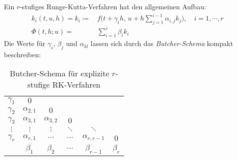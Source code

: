 \documentclass[a4paper, 11pt, accentcolor = tud3b]{tudreport}
\begin{document}
	            Ein \(r\)-stufiges Runge-Kutta-Verfahren hat den allgemeinen Aufbau:
	            \begin{align*}
	            	k_i(t, u, h) = k_i \coloneqq & \, f\Big( t + \gamma_i h,\, u + h \sum_{j=1}^{i-1} \alpha_{i,j} k_j \Big), \quad i = 1, \cdots, r \\
	            	\Phi(t, h; u) =              & \, \sum_{i=1}^{r} \beta_i k_i
	            \end{align*}
	            Die Werte für \( \gamma_i \), \( \beta_j \) und \( \alpha_{kl} \) lassen sich durch das \textit{Butcher-Schema} kompakt beschreiben:
	            \begin{table}[H]
	            	\centering
	            	\begin{tabular}{c|ccccc}
	            		\(\gamma_1\) &      \(0\)       &                  &            &                    &  \\
	            		\(\gamma_2\) & \(\alpha_{2,1}\) &      \(0\)       &            &                    &  \\
	            		\(\gamma_3\) & \(\alpha_{3,1}\) & \(\alpha_{3,2}\) &   \(0\)    &                    &  \\
	            		 \(\vdots\)  &    \(\vdots\)    &    \(\vdots\)    & \(\ddots\) &     \(\ddots\)     &  \\
	            		\(\gamma_r\) & \(\alpha_{r,1}\) &    \(\cdots\)    & \(\cdots\) & \(\alpha_{r,r-1}\) &    \(0\)    \\ \hline
	            		             &   \(\beta_1\)    &   \(\beta_2\)    & \(\cdots\) &  \(\beta_{r-1}\)   & \(\beta_r\)
	            	\end{tabular}
	            	\caption{Butcher-Schema für explizite \(r\)-stufige RK-Verfahren}
	            \end{table}
            
\end{document}
